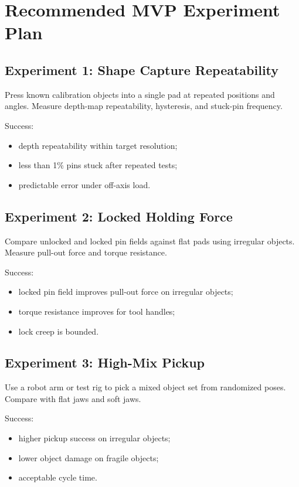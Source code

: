 \documentclass[11pt]{article}
\begin{document}
\section{Recommended MVP Experiment Plan}

\subsection{Experiment 1: Shape Capture Repeatability}

Press known calibration objects into a single pad at repeated positions and angles. Measure depth-map repeatability, hysteresis, and stuck-pin frequency.

Success:

\begin{itemize}[leftmargin=*]
  \item depth repeatability within target resolution;
  \item less than 1\% pins stuck after repeated tests;
  \item predictable error under off-axis load.
\end{itemize}

\subsection{Experiment 2: Locked Holding Force}

Compare unlocked and locked pin fields against flat pads using irregular objects. Measure pull-out force and torque resistance.

Success:

\begin{itemize}[leftmargin=*]
  \item locked pin field improves pull-out force on irregular objects;
  \item torque resistance improves for tool handles;
  \item lock creep is bounded.
\end{itemize}

\subsection{Experiment 3: High-Mix Pickup}

Use a robot arm or test rig to pick a mixed object set from randomized poses. Compare with flat jaws and soft jaws.

Success:

\begin{itemize}[leftmargin=*]
  \item higher pickup success on irregular objects;
  \item lower object damage on fragile objects;
  \item acceptable cycle time.
\end{itemize}
\end{document}
